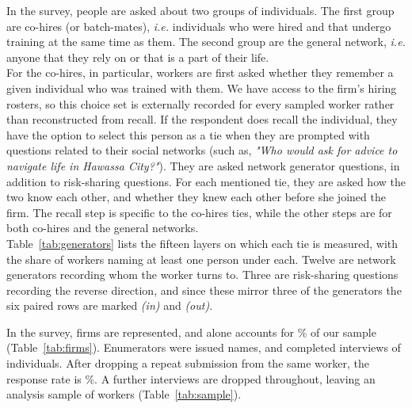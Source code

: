 \noindent In the survey, people are asked about two groups of individuals. The first group are co-hires (or batch-mates), \textit{i.e.} individuals who were hired and that undergo training at the same time as them. The second group are the general network, \textit{i.e.} anyone that they rely on or that is a part of their life. \\

\noindent For the co-hires, in particular, workers are first asked whether they remember a given individual who was trained with them. We have access to the firm's hiring rosters, so this choice set is externally recorded for every sampled worker rather than reconstructed from recall. If the respondent does recall the individual, they have the option to select this person as a tie when they are prompted with questions related to their social networks (such as, \textit{"Who would ask for advice to navigate life in Hawassa City?"}). They are asked \pnGenerators{} network generator questions, in addition to \pnRsQuestions{} risk-sharing questions. For each mentioned tie, they are asked how the two know each other, and whether they knew each other before she joined the firm. The recall step is specific to the co-hires ties, while the other steps are for both co-hires and the general networks. \\



\noindent Table~\ref{tab:generators} lists the fifteen layers on which each tie is measured, with the share of workers naming at least one person under each. Twelve are network generators recording whom the worker turns to. Three are risk-sharing questions recording the reverse direction, and since these mirror three of the generators the six paired rows are marked \emph{(in)} and \emph{(out)}.  \\
\clearpage


\noindent In the survey, \pnFirmsWord{} firms are represented, and \pnFirmTopLabel{} alone accounts for \pnFirmTopPct{}\% of our sample (Table~\ref{tab:firms}). Enumerators were issued \pnFrameCases{} names, and completed interviews of \pnSubmissions{} individuals. After dropping a repeat submission from the same worker, the response rate is \pnResponsePct{}\%. A further \pnProblemExcluded{} interviews are dropped throughout, leaving an analysis sample of \pnAnalysisN{} workers (Table~\ref{tab:sample}). \\

